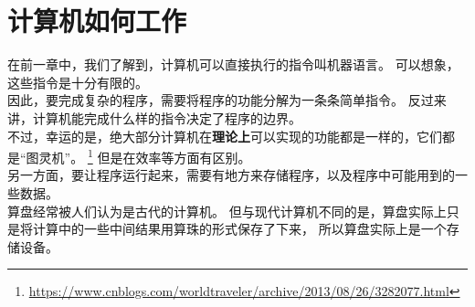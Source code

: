 \chapter{计算机如何工作}
在前一章中，我们了解到，计算机可以直接执行的指令叫机器语言。
可以想象，这些指令是十分有限的。\\
因此，要完成复杂的程序，需要将程序的功能分解为一条条简单指令。
反过来讲，计算机能完成什么样的指令决定了程序的边界。\\
不过，幸运的是，绝大部分计算机在\textbf{理论上}可以实现的功能都是一样的，它们都是“图灵机”。
\footnote{\url{https://www.cnblogs.com/worldtraveler/archive/2013/08/26/3282077.html}}
但是在效率等方面有区别。\\
另一方面，要让程序运行起来，需要有地方来存储程序，以及程序中可能用到的一些数据。\\
算盘经常被人们认为是古代的计算机。
但与现代计算机不同的是，算盘实际上只是将计算中的一些中间结果用算珠的形式保存了下来，
所以算盘实际上是一个存储设备。

